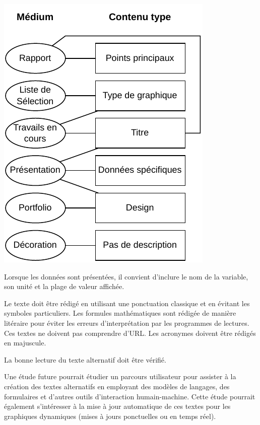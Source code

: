 \documentclass[a4paper,12pt]{article}
\begin{document}
\begin{multicols}{2}
\begin{center}
\includegraphics[width=.9\linewidth]{./img/alt-text.pdf}
\end{center}

Lorsque les données sont présentées, il convient d'inclure le nom de la variable, son unité et la plage de valeur affichée.

Le texte doit être rédigé en utilisant une ponctuation classique et en évitant les symboles particuliers. Les formules mathématiques sont rédigée de manière litéraire pour éviter les erreurs d'interprétation par les programmes de lectures. Ces textes ne doivent pas comprendre d'URL. Les acronymes doivent être rédigés en majuscule.

La bonne lecture du texte alternatif doit être vérifié.

Une étude future pourrait étudier un parcours utilisateur pour assister à la création des textes alternatifs en employant des modèles de langages, des formulaires et d'autres outils d'interaction humain-machine. Cette étude pourrait également s'intéresser à la mise à jour automatique de ces textes pour les graphiques dynamiques  (mises à jours ponctuelles ou en temps réel).

\end{multicols}
\end{document}
